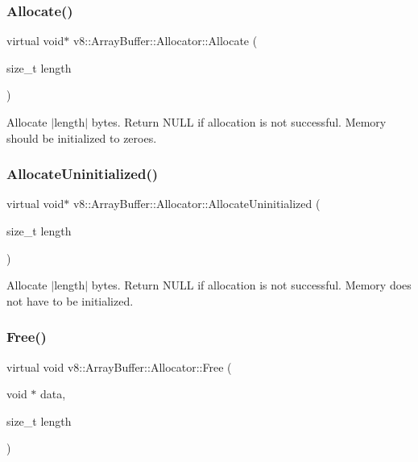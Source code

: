 \subsubsection{\texorpdfstring{Allocate()}{Allocate()}}
{\footnotesize\ttfamily virtual void$\ast$ v8\+::\+Array\+Buffer\+::\+Allocator\+::\+Allocate (\begin{DoxyParamCaption}\item[{size\+\_\+t}]{length }\end{DoxyParamCaption})\hspace{0.3cm}{\ttfamily [pure virtual]}}

Allocate $\vert$length$\vert$ bytes. Return N\+U\+LL if allocation is not successful. Memory should be initialized to zeroes. \mbox{\label{classv8_1_1ArrayBuffer_1_1Allocator_a92b2d5c0a826d3c435e12f3ee178f37a}} 
\subsubsection{\texorpdfstring{Allocate\+Uninitialized()}{AllocateUninitialized()}}
{\footnotesize\ttfamily virtual void$\ast$ v8\+::\+Array\+Buffer\+::\+Allocator\+::\+Allocate\+Uninitialized (\begin{DoxyParamCaption}\item[{size\+\_\+t}]{length }\end{DoxyParamCaption})\hspace{0.3cm}{\ttfamily [pure virtual]}}

Allocate $\vert$length$\vert$ bytes. Return N\+U\+LL if allocation is not successful. Memory does not have to be initialized. \mbox{\label{classv8_1_1ArrayBuffer_1_1Allocator_a419f59d2a103a5a8863809d7977c9cd8}} 
\subsubsection{\texorpdfstring{Free()}{Free()}}
{\footnotesize\ttfamily virtual void v8\+::\+Array\+Buffer\+::\+Allocator\+::\+Free (\begin{DoxyParamCaption}\item[{void $\ast$}]{data,  }\item[{size\+\_\+t}]{length }\end{DoxyParamCaption})\hspace{0.3cm}{\ttfamily [pure virtual]}}


